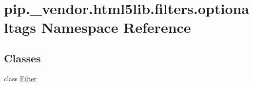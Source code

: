 \hypertarget{namespacepip_1_1__vendor_1_1html5lib_1_1filters_1_1optionaltags}{}\section{pip.\+\_\+vendor.\+html5lib.\+filters.\+optionaltags Namespace Reference}
\label{namespacepip_1_1__vendor_1_1html5lib_1_1filters_1_1optionaltags}
\subsection*{Classes}
\begin{DoxyCompactItemize}
\item 
class \hyperlink{classpip_1_1__vendor_1_1html5lib_1_1filters_1_1optionaltags_1_1Filter}{Filter}
\end{DoxyCompactItemize}
